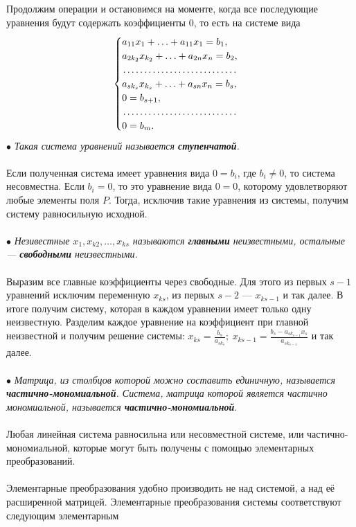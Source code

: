 Продолжим операции и остановимся на моменте, когда все последующие уравнения будут содержать
коэффициенты 0, то есть на системе вида $$\begin{cases}
	a_{11}x_1 + \ldots + a_{11}x_1 = b_1,\\
	a_{2k_2}x_{k_2} + \ldots + a_{2n}x_n = b_2,\\
	\dotfill\\
	a_{sk_s}x_{k_s} + \ldots + a_{sn}x_n = b_s,\\
	0 = b_{s+1},\\
	\dotfill\\
	0 = b_m.
\end{cases}$$
$\bullet$\textit{ Такая система уравнений называется \textbf{ступенчатой}.}\\\\
Если полученная система имеет уравнения вида $0 = b_i$, где $b_i \ne 0$, то система несовместна. Если $b_i =
0$, то это уравнение вида $0 = 0$, которому удовлетворяют любые элементы поля $P$. Тогда, исключив такие
уравнения из системы, получим систему равносильную исходной.\\\\
$\bullet$ \textit{Незивестные $x_1, x_{k2}, \ldots, x_{ks}$ называются \textbf{главными} неизвестными, остальные --- \textbf{свободными} неизвестными.}\\\\ 
Выразим все главные коэффициенты
через свободные. Для этого из первых $s-1$ уравнений исключим переменную $x_{ks}$, из первых $s-2$ --- $x_{ks-1}$ и так далее. В итоге получим систему, которая в каждом уравнении имеет только одну неизвестную. Разделим каждое уравнение на коэффициент при главной неизвестной и получим решение системы: $x_{ks} = \frac{b_s}{a_{sk_s}};\ x_{ks-1} = \frac{b_s - a_{sk_{s-1}}x_s}{a_{sk_{s-1}}}$ и так далее.\\\\
$\bullet$ \textit{Матрица, из столбцов которой можно составить единичную, называется \textbf{частично-мономиальной}. Система, матрица которой является частично мономиальной,
	называется \textbf{частично-мономиальной}}.\\\\
Любая линейная система равносильна или несовместной системе, или частично-мономиальной,
которые могут быть получены с помощью элементарных преобразований.\\\\
Элементарные преобразования удобно производить не над системой, а над её расширенной
матрицей. Элементарные преобразования системы соответствуют следующим элементарным
